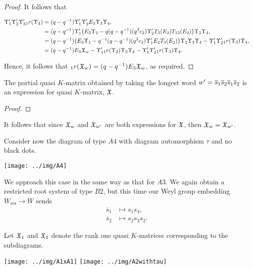 \documentclass[a4 paper, 10pt]{article}
\begin{document}
\begin{proof}
\noindent It follows that

\begin{align*}
\Upsilon_1^{\prime}\Upsilon_2^{\prime}\Upsilon_3^{\prime} {}_{1}r(\Upsilon_4)	&=	(q-q^{-1})\Upsilon_1^{\prime}\Upsilon_2^{\prime}E_3\Upsilon_3\Upsilon_4,\\
	&=	(q-q^{-1})\Upsilon_1^{\prime} \big( E_3\Upsilon_2 - q(q-q^{-1})(q^2c_2)\Upsilon_2^{\prime}T_3(E_2)T_{13}(E_2) \big)\Upsilon_3\Upsilon_4,\\
	&= (q-q^{-1})\big( E_3\Upsilon_1 - q^{-1}(q-q^{-1})(q^2c_2)\Upsilon_{1}^{\prime}E_2T_3(E_2) \big)\Upsilon_2\Upsilon_3\Upsilon_4 -  \Upsilon_1^{\prime}\Upsilon_2^{\prime} {}_{1}r(\Upsilon_3)\Upsilon_4, \\
	&= (q-q^{-1})E_3\mathfrak{X}_w - \Upsilon_1^{\prime}{}_{1}r(\Upsilon_2)\Upsilon_3\Upsilon_4 - \Upsilon_1^{\prime}\Upsilon_2^{\prime} {}_{1}r(\Upsilon_3)\Upsilon_4. 
\end{align*}

\noindent Hence, it follows that ${}_{1}r(\mathfrak{X}_w) = (q-q^{-1})E_3\mathfrak{X}_w$, as required.
\end{proof}

\begin{proposition}
The partial quasi $K$-matrix obtained by taking the longest word $w^{\prime} = \overline{s}_1\overline{s}_2\overline{s}_1\overline{s}_2$ is an expression for quasi $K$-matrix, $\mathfrak{X}$.
\end{proposition}

\begin{proof}

\end{proof}
\noindent It follows that since $\mathfrak{X}_w$ and $\mathfrak{X}_{w^{\prime}}$ are both expressions for $\mathfrak{X}$, then $\mathfrak{X}_w = \mathfrak{X}_{w^{\prime}}$.


\noindent Consider now the diagram of type $A4$ with diagram automorphism $\tau$ and no black dots.

\begin{center}
 \texttt{[image: ../img/A4]}
\end{center}

\noindent We approach this case in the same way as that for $A3$. We again obtain a restricted root system of type $B2$, but this time our Weyl group embedding $W_{\text{res}} \rightarrow W$ sends
\begin{align*}
\overline{s}_1 &\mapsto s_1s_4,\\
\overline{s}_2 &\mapsto s_2s_3s_2.
\end{align*}

\noindent Let $\mathfrak{X}_1$ and $\mathfrak{X}_2$ denote the rank one quasi $K$-matrices corresponding to the subdiagrams.

\begin{center}
\texttt{[image: ../img/A1xA1]} \qquad \texttt{[image: ../img/A2withtau]}
\end{center} 
\end{document}
